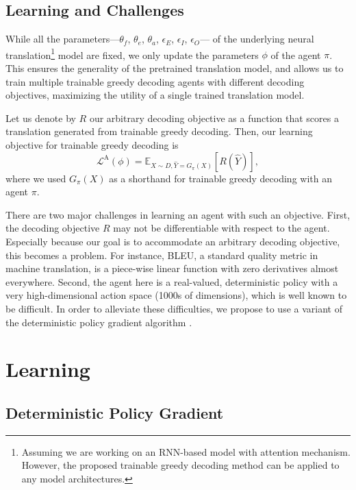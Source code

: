 \subsection{Learning and Challenges}
While all the parameters---$\theta_f$, $\theta_e$, $\theta_a$, $\epsilon_E$, $\epsilon_I$, $\epsilon_O$--- of the underlying neural translation\footnote{Assuming we are working on an RNN-based \sts model with attention mechanism. However, the proposed trainable greedy decoding method can be applied to any model architectures.} model are fixed, we only update the parameters $\phi$ of the agent $\pi$. This ensures the generality of the pretrained translation model, and allows us to train multiple trainable greedy decoding agents with different decoding objectives, maximizing the utility of a single trained translation model. 

Let us denote by $R$ our arbitrary decoding objective as a function that scores a translation generated from trainable greedy decoding. Then, our learning objective for trainable greedy decoding is 
\begin{equation}
\mathcal{L}^{\text{A}}(\phi) = \mathbb{E}_{X \sim D, \hat{Y}=G_{\pi}(X)}\left[R(\hat{Y})\right],
\end{equation}
where we used $G_{\pi}(X)$ as a shorthand for trainable greedy decoding with an agent $\pi$. 

There are two major challenges in learning an agent with such an objective. First, the decoding objective $R$ may not be differentiable with respect to the agent. Especially because our goal is to accommodate an arbitrary decoding objective, this becomes a problem. For instance, BLEU, a standard quality metric in machine translation, is a piece-wise linear function with zero derivatives almost everywhere. Second, the agent here is a real-valued, deterministic policy with a very high-dimensional action space (1000s of dimensions), which is well known to be difficult. In order to alleviate these difficulties, we propose to use a variant of the deterministic policy gradient algorithm \citep{silver2014deterministic,lillicrap2015continuous}.



\section{Learning}

\subsection{Deterministic Policy Gradient}

